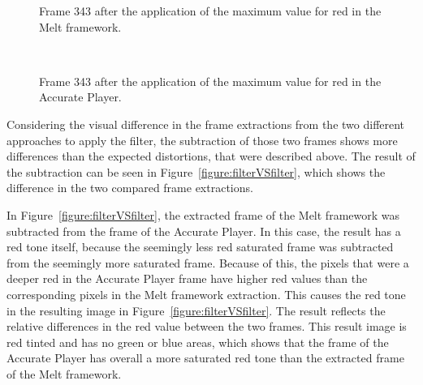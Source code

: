 \documentclass[../MasterThesis.tex]{subfiles}
\begin{document}
\begin{minipage}{0.48\textwidth}
	
	\begin{figure}[H]
		\begin{center}
			\caption[Frame 343 after the application of the red filter in the Melt framework.]{Frame 343 after the application of the maximum value for red in the Melt framework.}
			\label{figure:redMelt}
		\end{center}
	\end{figure}
\end{minipage}\begin{minipage}{0.04\textwidth}
	\ 
\end{minipage}\begin{minipage}{0.48\textwidth}
	
	\begin{figure}[H]
		\begin{center}
			\caption[Frame 343 after the application of the red filter in the Accurate Player.]{Frame 343 after the application of the maximum value for red in the Accurate Player.}
			\label{figure:redAP}
		\end{center}
	\end{figure}
\end{minipage}

\vspace*{1.5em}
Considering the visual difference in the frame extractions from the two different approaches to apply the filter, the subtraction of those two frames shows more differences than the expected distortions, that were described above. The result of the subtraction can be seen in Figure~\ref{figure:filterVSfilter}, which shows the difference in the two compared frame extractions.

In Figure~\ref{figure:filterVSfilter}, the extracted frame of the Melt framework was subtracted from the frame of the Accurate Player.
In this case, the result has a red tone itself, because the seemingly less red saturated frame was subtracted from the seemingly more saturated frame. Because of this, the pixels that were a deeper red in the Accurate Player frame have higher red values than the corresponding pixels in the Melt framework extraction. This causes the red tone in the resulting image in Figure~\ref{figure:filterVSfilter}.
The result reflects the relative differences in the red value between the two frames. This result image is red tinted and has no green or blue areas, which shows that the frame of the Accurate Player has overall a more saturated red tone than the extracted frame of the Melt framework.
\end{document}
